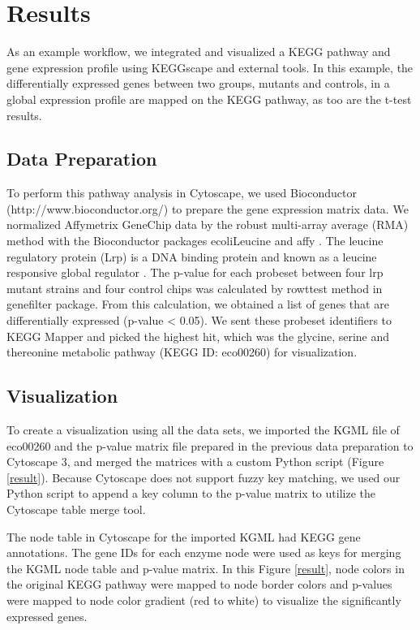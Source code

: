 \documentclass[10pt,a4paper,twocolumn]{article}
\begin{document}
\section*{Results}
As an example workflow, we integrated and visualized a KEGG pathway and gene expression profile using KEGGscape and external tools.  In this example, the differentially expressed genes between two groups, mutants and controls, in a global expression profile are mapped on the KEGG pathway, as too are the t-test results.

\subsection*{Data Preparation}
To perform this pathway analysis in Cytoscape, we used Bioconductor (http://www.bioconductor.org/) to prepare the gene expression matrix data. We normalized Affymetrix GeneChip data by the robust multi-array average (RMA) method with the Bioconductor packages ecoliLeucine \cite{ecoliLeucine}\cite{hung2002global} and affy \cite{gautier2004affy}.  The leucine regulatory protein (Lrp) is a DNA binding protein and known as a leucine responsive global regulator \cite{hung2002global}. The p-value for each probeset between four lrp mutant strains and four control chips was calculated by rowttest method in genefilter package\cite{genefilter}.  From this calculation, we obtained a list of genes that are differentially expressed (p-value < 0.05). We sent these probeset identifiers to KEGG Mapper and picked the highest hit, which was the glycine, serine and thereonine metabolic pathway (KEGG ID: eco00260) for visualization.

\subsection*{Visualization}
To create a visualization using all the data sets, we imported the KGML file of eco00260 and the p-value matrix file prepared in the previous data preparation to Cytoscape 3, and merged the matrices with a custom Python script (Figure \ref{result}). Because Cytoscape does not support fuzzy key matching, we used our Python script to append a key column to the p-value matrix to utilize the Cytoscape table merge tool.
\newline

The node table in Cytoscape for the imported KGML had KEGG gene annotations. The gene IDs for each enzyme node were used as keys for merging the KGML node table and p-value matrix. In this Figure \ref{result}, node colors in the original KEGG pathway were mapped to node border colors and p-values were mapped to node color gradient (red to white) to visualize the significantly expressed genes.
\end{document}

